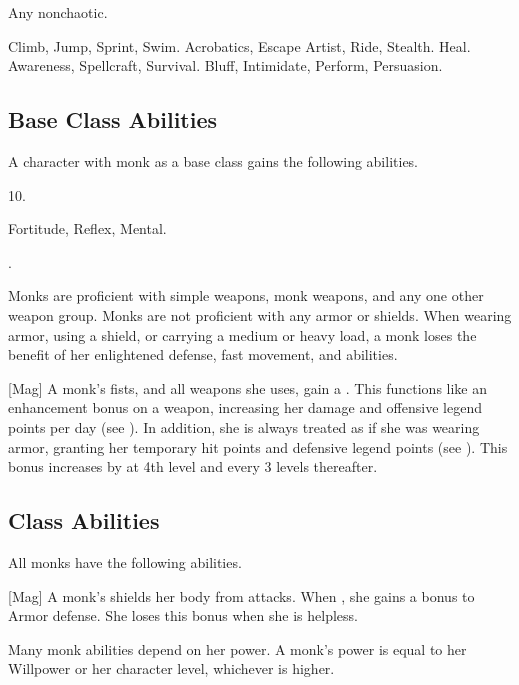      Any nonchaotic.

     Climb, Jump, Sprint, Swim.
     Acrobatics, Escape Artist, Ride, Stealth.
     Heal.
     Awareness, Spellcraft, Survival.
     Bluff, Intimidate, Perform, Persuasion.

    \subsection{Base Class Abilities}
        A character with monk as a base class gains the following abilities.

         10.

          Fortitude,  Reflex,  Mental.

         .

        Monks are proficient with simple weapons, monk weapons, and any one other weapon group.
        Monks are not proficient with any armor or shields.
        When wearing armor, using a shield, or carrying a medium or heavy load, a monk loses the benefit of her enlightened defense, fast movement, and \ki abilities.

        [Mag] A monk's fists, and all weapons she uses, gain a  .
        This functions like an enhancement bonus on a weapon, increasing her damage and offensive legend points per day (see ).
        In addition, she is always treated as if she was wearing  armor, granting her temporary hit points and defensive legend points (see ).
        This bonus increases by  at 4th level and every 3 levels thereafter.

    \subsection{Class Abilities}
        All monks have the following abilities.

        [Mag]
        A monk's \ki shields her body from attacks.
        When \monkunencumbered, she gains a  bonus to Armor defense.
        She loses this bonus when she is helpless.

        Many monk abilities depend on her \ki power.
        A monk's \ki power is equal to her Willpower or her character level, whichever is higher.

